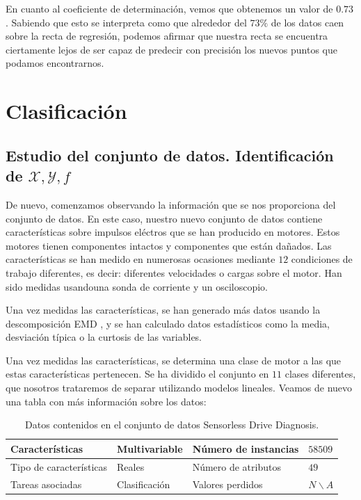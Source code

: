 \documentclass[a4paper, 20pt]{article}
\begin{document}
En cuanto al coeficiente de determinación, vemos que obtenemos un valor de $0.73$. Sabiendo que esto se interpreta como que alrededor del $73\%$ de los datos caen sobre la recta de regresión, podemos afirmar que nuestra recta se encuentra ciertamente lejos de ser capaz de predecir con precisión los nuevos puntos que podamos encontrarnos.

\newpage

\section{Clasificación}

\subsection{Estudio del conjunto de datos. Identificación de $\mathcal X, \mathcal Y, f$}

De nuevo, comenzamos observando la información que se nos proporciona del conjunto de datos. En este caso, nuestro nuevo conjunto de datos \cite{noauthor_uci_nodate} contiene características sobre impulsos eléctros que se han producido en motores. Estos motores tienen componentes intactos y componentes que están dañados. Las características se han medido en numerosas ocasiones mediante $12$ condiciones de trabajo diferentes, es decir: diferentes velocidades o cargas sobre el motor. Han sido medidas usandouna sonda de corriente y un osciloscopio.

Una vez medidas las características, se han generado más datos usando la descomposición EMD \cite{noauthor_hilberthuang_2021}, y se han calculado datos estadísticos como la media, desviación típica o la curtosis de las variables.

Una vez medidas las características, se determina una clase de motor a las que estas características pertenecen. Se ha dividido el conjunto en $11$ clases diferentes, que nosotros trataremos de separar utilizando modelos lineales. Veamos de nuevo una tabla con más información sobre los datos:


\begin{table}[h]
  \centering
  \begin{tabular}{|l|l|l|l|}
    \hline
    Características         & Multivariable & Número de instancias & $58509$ \\ \hline
    Tipo de características & Reales        & Número de atributos  & $49$    \\ \hline
    Tareas asociadas        & Clasificación     & Valores perdidos     & $N\backslash A$   \\ \hline
  \end{tabular}
  \caption{Datos contenidos en el conjunto de datos Sensorless Drive Diagnosis.}
\end{table}
\end{document}
